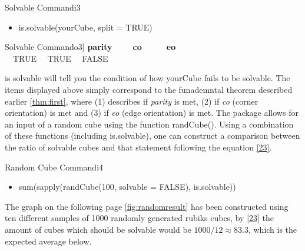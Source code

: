 \documentclass{article}
\newcounter{theo}[section]\setcounter{theo}{0}
\begin{document}
\begin{myinput}{Solvable Command}{i3}
\begin{itemize}
\item is.solvable(yourCube, split = TRUE)
\end{itemize}
\end{myinput}
\begin{myoutput}{Solvable Command}{o3}]
  \textbf{parity}\ \ \ \ \ \textbf{co}\ \ \ \ \ \ \textbf{eo}\\
  \ \ TRUE \ \   TRUE  \ \ FALSE
\end{myoutput}

is solvable will tell you the condition of how yourCube fails to be solvable. The items displayed above simply correspond to the funademntal theorem described earlier \ref{thm:first}, where (1) describes if \textit{parity} is met, (2) if \textit{co} (corner orientation) is met and (3) if \textit{eo} (edge orientation) is met. \newline The package allows for an input of a random cube using the function randCube(). Using a combination of these functions (including is.solvable), one can construct a comparison between the ratio of solvable cubes and that statement following the equation \ref{23}.

\begin{myinput}{Random Cube Command}{i4}
\begin{itemize}
\item sum(sapply(randCube(100, solvable = FALSE), is.solvable))
\end{itemize}
\end{myinput}
The graph on the following page \ref{fig:randomresult} has been constructed using ten different samples of 1000 randomly generated rubiks cubes, by \ref{23} the amount of cubes which should be solvable would be $1000/12 \approx 83.3$, which is the expected average below.\newline 
\end{document}
